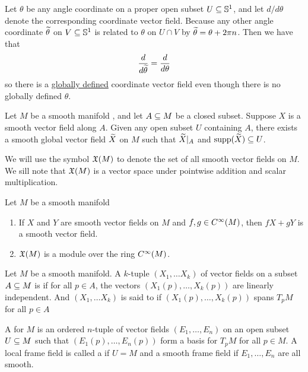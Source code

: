 \begin{ex}
Let $\theta$ be any angle coordinate on a proper open subset $U\subseteq \mathbb{S}^1$, and let $d/d\theta$ denote the corresponding coordinate vector field. Because any other angle coordinate $\widetilde\theta$ on $V\subseteq \mathbb{S}^1$ is related to $\theta$ on $U\cap V$ by $\widetilde\theta = \theta + 2\pi n$. Then we have that 
\[\frac{d}{d\widetilde \theta} = \frac{d}{d\theta}\]
so there is a \ul{globally defined} coordinate vector field even though there is no globally defined $\theta$.
\end{ex}

\setcounter{thm}{5}

\begin{lem}
Let $M$ be a smooth manifold \wowob, and let $A\subseteq M$ be a closed subset. Suppose $X$ is a smooth vector field along $A$. Given any open subset $U$ containing $A$, there exists a smooth global vector field $\widetilde X$ on $M$ such that $\widetilde X|_A$ and $\text{supp}(\widetilde X)\subseteq U$.
\end{lem}

\nb We will use the symbol $\mathfrak{X}(M)$ to denote the set of all smooth vector fields on $M$. We sill note that $\mathfrak{X}(M)$ is a vector space under pointwise addition and scalar multiplication.


\setcounter{thm}{7}

\begin{prop}
Let $M$ be a smooth manifold \wowob
\begin{enumerate}
    \item If $X$ and $Y$ are smooth vector fields on $M$ and $f,g\in C^\infty(M)$, then $fX + gY$ is a smooth vector field.
    \item $\mathfrak{X}(M)$ is a module over the ring $C^\infty(M)$.
\end{enumerate}
\end{prop}

\dfn Let $M$ be a smooth manifold. A $k$-tuple $(X_1,\ldots X_k)$ of vector fields on a subset $A\subseteq M$ is  if for all $p\in A$, the vectors $(X_1(p),\ldots,X_k(p))$ are linearly independent. And $(X_1,\ldots X_k)$ is said to  if $(X_1(p),\ldots,X_k(p))$ spans $T_pM$ for all $p\in A$

\dfn A  for $M$ is an ordered $n$-tuple of vector fields $(E_1,\ldots,E_n)$ on an open subset $U\subseteq M$ such that $(E_1(p),\ldots,E_n(p))$ form a basis for $T_pM$ for all $p\in M$. A local frame field is called a  if $U = M$ and a smooth frame field if $E_1,\ldots,E_n$ are all smooth.

